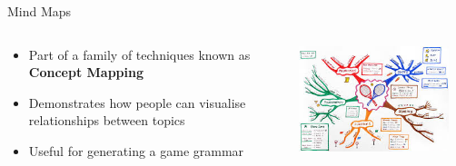 \begin{frame}{Mind Maps}
	\begin{columns}
		\begin{column}{0.48\textwidth}
			\begin{itemize}
				\item Part of a family of techniques known as \textbf{Concept Mapping}
				\item Demonstrates how people can visualise relationships between topics
				\item Useful for generating a game grammar
			\end{itemize}
		\end{column}
		\begin{column}{0.48\textwidth}
\includegraphics[width=0.9\textwidth, height=0.7\textheight]{mind_map}
		\end{column}
	\end{columns}
\end{frame}

